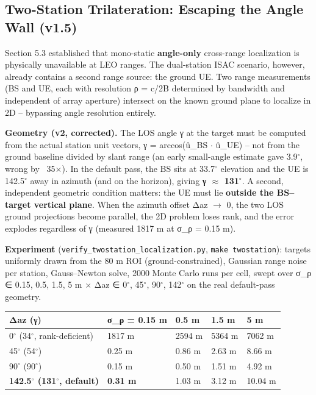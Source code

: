 \documentclass[11pt]{article}
\begin{document}
\subsection{Two-Station Trilateration: Escaping the Angle Wall (v1.5)}

Section 5.3 established that mono-static \textbf{angle-only} cross-range localization is physically unavailable at LEO ranges. The dual-station ISAC scenario, however, already contains a second range source: the ground UE. Two range measurements (BS and UE, each with resolution ρ = c/2B determined by bandwidth and independent of array aperture) intersect on the known ground plane to localize in 2D -- bypassing angle resolution entirely.

\textbf{Geometry (v2, corrected).} The LOS angle γ at the target must be computed from the actual station unit vectors, γ = arccos(û\_BS $\cdot$ û\_UE) -- not from the ground baseline divided by slant range (an early small-angle estimate gave 3.9$^\circ$, wrong by ~35$\times$). In the default pass, the BS sits at 33.7$^\circ$ elevation and the UE is 142.5$^\circ$ away in azimuth (and on the horizon), giving \textbf{γ $\approx$ 131$^\circ$}. A second, independent geometric condition matters: the UE must lie \textbf{outside the BS--target vertical plane}. When the azimuth offset Δaz $\rightarrow$ 0, the two LOS ground projections become parallel, the 2D problem loses rank, and the error explodes regardless of γ (measured 1817 m at σ\_ρ = 0.15 m).

\textbf{Experiment} (\texttt{verify\_twostation\_localization.py}, \texttt{make twostation}): targets uniformly drawn from the 80 m ROI (ground-constrained), Gaussian range noise per station, Gauss--Newton solve, 2000 Monte Carlo runs per cell, swept over σ\_ρ ∈ {0.15, 0.5, 1.5, 5} m $\times$ Δaz ∈ {0$^\circ$, 45$^\circ$, 90$^\circ$, 142$^\circ$} on the real default-pass geometry.

\begin{table}[ht]
\centering
\small
\begin{tabular}{lllll}
Δaz (γ) & σ\_ρ = 0.15 m & 0.5 m & 1.5 m & 5 m \\
\hline
0$^\circ$ (34$^\circ$, rank-deficient) & 1817 m & 2594 m & 5364 m & 7062 m \\
45$^\circ$ (54$^\circ$) & 0.25 m & 0.86 m & 2.63 m & 8.66 m \\
90$^\circ$ (90$^\circ$) & 0.15 m & 0.50 m & 1.51 m & 4.92 m \\
\textbf{142.5$^\circ$ (131$^\circ$, default)} & \textbf{0.31 m} & 1.03 m & 3.12 m & 10.04 m \\
\hline
\end{tabular}
\end{table}
\end{document}
